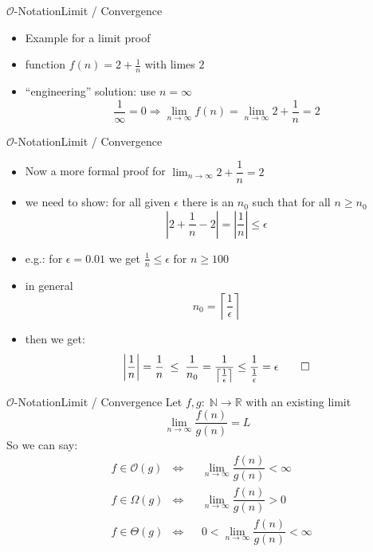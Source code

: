 \begin{frame}{$\mathcal{O}$-Notation}{Limit / Convergence}
  \begin{itemize}
  \item Example for a limit proof
  \item function $f(n) = 2 + \frac{1}{n}$ with limes $2$
  \item ``engineering'' solution: use $n=\infty{}$
    \begin{displaymath}
      \frac{1}{\infty}=0 \Rightarrow       \lim_{n \to \infty} f(n)
        = \lim_{n \to \infty} 2 + \dfrac{1}{n}
        = 2
    \end{displaymath}
  \end{itemize}
\end{frame}
\begin{frame}{$\mathcal{O}$-Notation}{Limit / Convergence}
  \begin{itemize}
  \item Now a more formal proof for $\displaystyle\lim_{n \to \infty} 2 +
    \dfrac{1}{n}  = 2$
  \item we need to show: for all given $\epsilon$ there is an $n_0$ such
    that for all $n \geq n_0$
    \begin{displaymath}
      \left| 2 + \dfrac{1}{n} - 2 \right| =  \left| \dfrac{1}{n}  \right| \leq \epsilon
    \end{displaymath}
  \item<2-> e.g.: for $\epsilon=0.01$ we get $\frac{1}{n} \leq \epsilon$
    for $n\geq 100$
  \item<3-> in general
    \begin{displaymath}
      n_0 = \left\lceil \dfrac{1}{\epsilon} \right\rceil
    \end{displaymath}
  \item<4-> then we get:
    \begin{eqnarray*}
      \left|
        \frac{1}{n} \vphantom{\dfrac{1}{\frac{1}{\epsilon}}}
      \right|
        = \dfrac{1}{n}
      \; \leq \;
      \dfrac{1}{n_0} =  \dfrac{1}{\left\lceil\frac{1}{\epsilon}
        \right\rceil}
\leq   \dfrac{1}{\frac{1}{\epsilon}}
        = \epsilon
      \qed
    \end{eqnarray*}
  \end{itemize}
\end{frame}


\begin{frame}{$\mathcal{O}$-Notation}{Limit / Convergence}
  Let $f,g \! : \; \mathbb{N} \to \mathbb{R}$ with an existing limit
  \[\lim_{n \to \infty} \dfrac{f(n)}{g(n)} = L\]
  So we can say:
  \begin{align}
    & f \in \mathcal{O}(g) & \Leftrightarrow
    && \lim_{n \to \infty} \dfrac{f(n)}{g(n)} < \infty\\
    & f \in \Omega(g) & \Leftrightarrow
    && \lim_{n \to \infty} \dfrac{f(n)}{g(n)} > 0\\
    & f \in \Theta(g) & \Leftrightarrow
    && 0 < \lim_{n \to \infty} \dfrac{f(n)}{g(n)} < \infty
  \end{align}
\end{frame}

